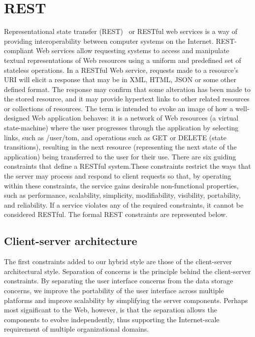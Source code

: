\section{REST}
\label{rest}
Representational state transfer (REST)~\cite{w3c2004web} or RESTful web services is a way of providing interoperability between computer systems on the Internet. REST-compliant Web services allow requesting systems to access and manipulate textual representations of Web resources using a uniform and predefined set of stateless operations.  In a RESTful Web service, requests made to a resource's URI will elicit a response that may be in XML, HTML, JSON or some other defined format. The response may confirm that some alteration has been made to the stored resource, and it may provide hypertext links to other related resources or collections of resources. The term is intended to evoke an image of how a well-designed Web application behaves: it is a network of Web resources (a virtual state-machine) where the user progresses through the application by selecting links, such as /user/tom, and operations such as GET or DELETE (state transitions), resulting in the next resource (representing the next state of the application) being transferred to the user for their use. There are six guiding constraints that define a RESTful system.These constraints restrict the ways that the server may process and respond to client requests so that, by operating within these constraints, the service gains desirable non-functional properties, such as performance, scalability, simplicity, modifiability, visibility, portability, and reliability. If a service violates any of the required constraints, it cannot be considered RESTful. The formal REST constraints are represented below.

\subsection{Client-server architecture}
The first constraints added to our hybrid style are those of the client-server architectural style. Separation of concerns is the principle behind the client-server constraints. By separating the user interface concerns from the data storage concerns, we improve the portability of the user interface across multiple platforms and improve scalability by simplifying the server components. Perhaps most significant to the Web, however, is that the separation allows the components to evolve independently, thus supporting the Internet-scale requirement of multiple organizational domains.

